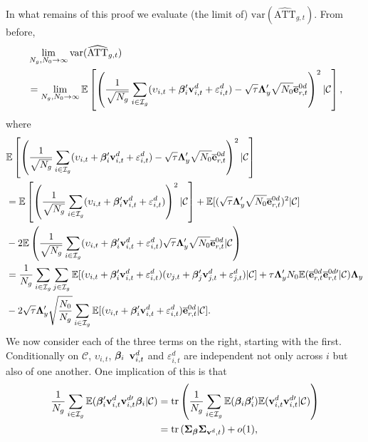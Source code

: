 \documentclass[12pt,fleqn]{article}
\begin{document}
In what remains of this proof we evaluate (the limit of) $\mathrm{var}(\widehat{\mathrm{ATT}}_{g,t})$. From before,
\begin{align}
& \lim_{N_g,N_0\to\infty} \mathrm{var}(\widehat{\mathrm{ATT}}_{g,t}) \notag\\
&= \lim_{N_g,N_0\to\infty} \mathbb{E} \left[\left(\frac{1}{\sqrt{N_g}}\sum_{i\in \mathcal{I}_g} (\upsilon_{i,t}  + \boldsymbol{\beta}_i'\mathbf{v}_{i,t}^d + \varepsilon_{i,t}^d ) - \sqrt{\tau}\boldsymbol{\Lambda}_y'\sqrt{N_0}\overline{\mathbf{e}}_{r,t}^{0d} \right)^2 |\mathcal{C}\right] ,
\end{align}
where
\begin{align}
& \mathbb{E} \left[\left(\frac{1}{\sqrt{N_g}}\sum_{i\in \mathcal{I}_g} (\upsilon_{i,t}  + \boldsymbol{\beta}_i'\mathbf{v}_{i,t}^d + \varepsilon_{i,t}^d ) - \sqrt{\tau}\boldsymbol{\Lambda}_y'\sqrt{N_0}\overline{\mathbf{e}}_{r,t}^{0d} \right)^2 |\mathcal{C}\right] \notag\\
&= \mathbb{E} \left[\left(\frac{1}{\sqrt{N_g}}\sum_{i\in \mathcal{I}_g} (\upsilon_{i,t}  + \boldsymbol{\beta}_i'\mathbf{v}_{i,t}^d + \varepsilon_{i,t}^d )  \right)^2 |\mathcal{C}\right]  + \mathbb{E} [(\sqrt{\tau}\boldsymbol{\Lambda}_y'\sqrt{N_0}\overline{\mathbf{e}}_{r,t}^{0d} )^2 |\mathcal{C}] \notag\\
& - 2\mathbb{E} \left(\frac{1}{\sqrt{N_g}}\sum_{i\in \mathcal{I}_g} (\upsilon_{i,t}  + \boldsymbol{\beta}_i'\mathbf{v}_{i,t}^d + \varepsilon_{i,t}^d ) \sqrt{\tau}\boldsymbol{\Lambda}_y'\sqrt{N_0}\overline{\mathbf{e}}_{r,t}^{0d} |\mathcal{C}\right)\notag\\
&= \frac{1}{N_g}\sum_{i\in \mathcal{I}_g}\sum_{j\in \mathcal{I}_g}\mathbb{E} [ (\upsilon_{i,t}  + \boldsymbol{\beta}_i'\mathbf{v}_{i,t}^d + \varepsilon_{i,t}^d )(\upsilon_{j,t}  + \boldsymbol{\beta}_j'\mathbf{v}_{j,t}^d + \varepsilon_{j,t}^d )  |\mathcal{C} ]  + \tau \boldsymbol{\Lambda}_y' N_0\mathbb{E}(\overline{\mathbf{e}}_{r,t}^{0d}\overline{\mathbf{e}}_{r,t}^{0d\prime} |\mathcal{C}) \boldsymbol{\Lambda}_y\notag\\
& - 2\sqrt{\tau}\boldsymbol{\Lambda}_y'\sqrt{\frac{N_0}{N_g}}\sum_{i\in \mathcal{I}_g}\mathbb{E} [ (\upsilon_{i,t}  + \boldsymbol{\beta}_i'\mathbf{v}_{i,t}^d + \varepsilon_{i,t}^d ) \overline{\mathbf{e}}_{r,t}^{0d} |\mathcal{C}]. \label{var}
\end{align}
We now consider each of the three terms on the right, starting with the first. Conditionally on $\mathcal{C}$, $\upsilon_{i,t}$, $\boldsymbol{\beta}_i$  $\mathbf{v}_{i,t}^d$ and $\varepsilon_{i,t}^d$ are independent not only across $i$ but also of one another. One implication of this is that
\begin{align}
 \frac{1}{N_g}\sum_{i\in \mathcal{I}_g} \mathbb{E}  (\boldsymbol{\beta}_i'\mathbf{v}_{i,t}^d\mathbf{v}_{i,t}^{d\prime}\boldsymbol{\beta}_i |\mathcal{C} ) & =  \mathrm{tr}\left(\frac{1}{N_g}\sum_{i\in \mathcal{I}_g} \mathbb{E}  (\boldsymbol{\beta}_i\boldsymbol{\beta}_i')\mathbb{E}  (\mathbf{v}_{i,t}^d\mathbf{v}_{i,t}^{d\prime} |\mathcal{C} ) \right) \notag\\
 & =  \mathrm{tr}\,(\boldsymbol{\Sigma}_{\boldsymbol{\beta}} \boldsymbol{\Sigma}_{\mathbf{v}^d,t}) + o(1) ,
\end{align}
\end{document}
